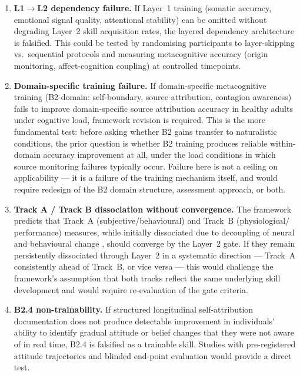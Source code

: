\documentclass[12pt, a4paper]{article}
\begin{document}
\begin{enumerate}[leftmargin=2em]

\item \textbf{L1$\to$L2 dependency failure.} If Layer~1 training (somatic accuracy,
emotional signal quality, attentional stability) can be omitted without degrading
Layer~2 skill acquisition rates, the layered dependency architecture is falsified.
This could be tested by randomising participants to layer-skipping vs.\ sequential
protocols and measuring metacognitive accuracy (origin monitoring, affect-cognition
coupling) at controlled timepoints.

\item \textbf{Domain-specific training failure.} If domain-specific metacognitive
training (B2-domain: self-boundary, source attribution, contagion awareness) fails
to improve domain-specific source attribution accuracy in healthy adults under
cognitive load, framework revision is required. This is the more fundamental
test: before asking whether B2 gains transfer to naturalistic conditions, the
prior question is whether B2 training produces reliable within-domain accuracy
improvement at all, under the load conditions in which source monitoring failures
typically occur. Failure here is not a ceiling on applicability --- it is a
failure of the training mechanism itself, and would require redesign of the
B2 domain structure, assessment approach, or both.

\item \textbf{Track A / Track B dissociation without convergence.} The framework
predicts that Track~A (subjective/behavioural) and Track~B (physiological/
performance) measures, while initially dissociated due to decoupling of neural and
behavioural change \citep{yue2023}, should converge by the Layer~2 gate. If
they remain persistently dissociated through Layer~2 in a systematic direction ---
Track~A consistently ahead of Track~B, or vice versa --- this would challenge the
framework's assumption that both tracks reflect the same underlying skill
development and would require re-evaluation of the gate criteria.

\item \textbf{B2.4 non-trainability.} If structured longitudinal self-attribution
documentation does not produce detectable improvement in individuals' ability to
identify gradual attitude or belief changes that they were not aware of in real
time, B2.4 is falsified as a trainable skill. Studies with pre-registered attitude
trajectories and blinded end-point evaluation would provide a direct test.

\end{enumerate}
\end{document}
